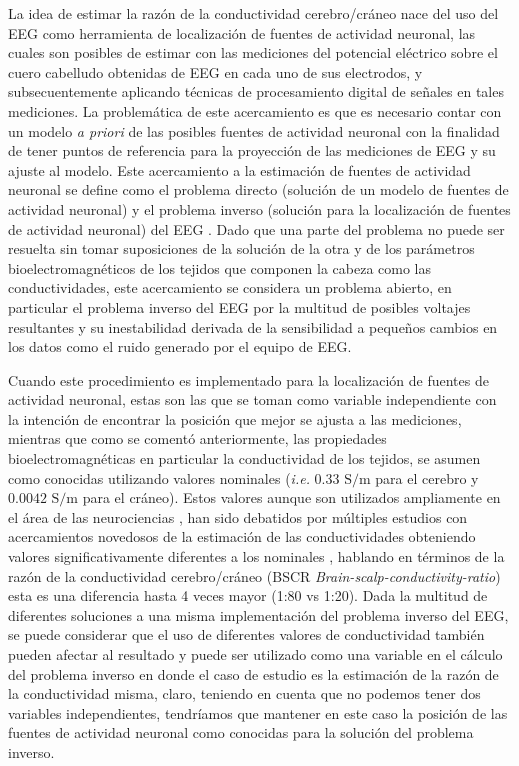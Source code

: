 La idea de estimar la razón de la conductividad cerebro/cráneo nace del uso del EEG como herramienta de localización de fuentes de actividad neuronal, las cuales son posibles de estimar con las mediciones del potencial eléctrico sobre el cuero cabelludo obtenidas de EEG en cada uno de sus electrodos, y subsecuentemente aplicando técnicas de procesamiento digital de señales en tales mediciones. La problemática de este acercamiento es que es necesario contar con un modelo \emph{a priori} de las posibles fuentes de actividad neuronal con la finalidad de tener puntos de referencia para la proyección de las mediciones de EEG y su ajuste al modelo. Este acercamiento a la estimación de fuentes de actividad neuronal se define como el problema directo (solución de un modelo de fuentes de actividad neuronal) y el problema inverso (solución para la localización de fuentes de actividad neuronal) del EEG \cite{Hallez2007}. Dado que una parte del problema no puede ser resuelta sin tomar suposiciones de la solución de la otra y de los parámetros bioelectromagnéticos de los tejidos que componen la cabeza como las conductividades, este acercamiento se considera un problema abierto, en particular el problema inverso del EEG por la multitud de posibles voltajes resultantes y su inestabilidad derivada de la sensibilidad a pequeños cambios en los datos como el ruido generado por el equipo de EEG.

Cuando este procedimiento es implementado para la localización de fuentes de actividad neuronal, estas son las que se toman como variable independiente con la intención de encontrar la posición que mejor se ajusta a las mediciones, mientras que como se comentó anteriormente, las propiedades bioelectromagnéticas en particular la conductividad de los tejidos, se asumen como conocidas utilizando valores nominales (\emph{i.e.} $0.33\text{ S/m}$ para el cerebro y $0.0042 \text{ S/m}$ para el cráneo). Estos valores aunque son utilizados ampliamente en el área de las neurociencias \cite{Rush1968,Rush1969,Cohen1983}, han sido debatidos por múltiples estudios con acercamientos novedosos de la estimación de las conductividades obteniendo valores significativamente diferentes a los nominales \cite{McCann2019}, hablando en términos de la razón de la conductividad cerebro/cráneo (BSCR \emph{Brain-scalp-conductivity-ratio}) esta es una diferencia hasta 4 veces mayor (1:80 vs 1:20). Dada la multitud de diferentes soluciones a una misma implementación del problema inverso del EEG, se puede considerar que el uso de diferentes valores de conductividad también pueden afectar al resultado y puede ser utilizado como una variable en el cálculo del problema inverso en donde el caso de estudio es la estimación de la razón de la conductividad misma, claro, teniendo en cuenta que no podemos tener dos variables independientes, tendríamos que mantener en este caso la posición de las fuentes de actividad neuronal como conocidas para la solución del problema inverso.









